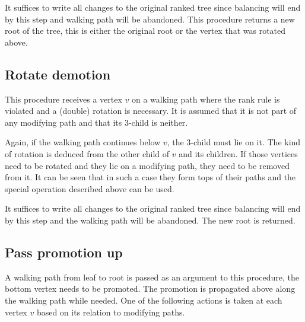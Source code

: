 It suffices to write all changes to the original ranked tree since balancing will end by this step and walking path will be abandoned. 
This procedure returns a new root of the tree, this is either the original root or the vertex that was rotated above.

\subsection{Rotate demotion}

This procedure receives a vertex $v$ on a walking path where the rank rule is violated and a (double) rotation is necessary. It is assumed that it is not part of any modifying path and that its $3$-child is neither. 

Again, if the walking path continues below $v$, the 3-child must lie on it. The kind of rotation is deduced from the other child of $v$ and its children. If those vertices need to be rotated and they lie on a modifying path, they need to be removed from it. It can be seen that in such a case they form tops of their paths and the special operation described above can be used.

It suffices to write all changes to the original ranked tree since balancing will end by this step and the walking path will be abandoned. The new root is returned.

\subsection{Pass promotion up}

A walking path from leaf to root is passed as an argument to this procedure, the bottom vertex needs to be promoted. The promotion is propagated above along the walking path while needed. One of the following actions is taken at each vertex $v$ based on its relation to modifying paths.

